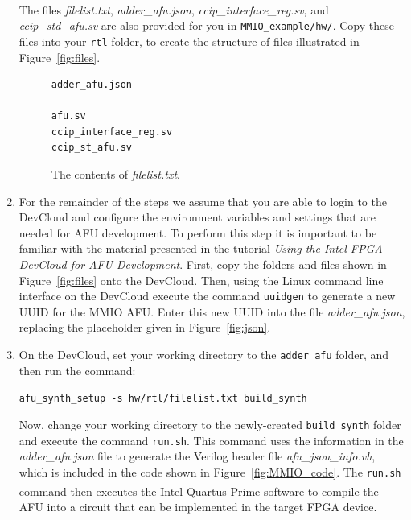 \documentclass[11pt, twoside, pdftex]{article}
\begin{document}
\begin{enumerate}
~\\
\noindent
The files {\it filelist.txt}, {\it adder\_afu.json}, {\it ccip\_interface\_reg.sv}, and 
{\it ccip\_std\_afu.sv} are also provided for you in \texttt{MMIO\_example/hw/}. Copy these files into your \texttt{rtl} folder, to
create the structure of files illustrated in Figure~\ref{fig:files}.

\lstset{language=C,numbers=none,escapechar=|}
\begin{figure}[h]
\begin{center}
\begin{minipage}[h]{4.5 cm}
\begin{lstlisting}[name=filelist]
adder_afu.json

afu.sv
ccip_interface_reg.sv
ccip_st_afu.sv
\end{lstlisting}
\end{minipage}
\caption{The contents of {\it filelist.txt}.}
\label{fig:filelist}
\end{center}
\end{figure}


\item
For the remainder of the steps we assume that you are able to login to the DevCloud
and configure the environment variables and settings that are needed for AFU development. 
To perform this step it is important to be familiar with the material presented in the
tutorial {\it Using the Intel FPGA DevCloud for AFU Development}. First, 
copy the folders and files shown in Figure~\ref{fig:files} onto the DevCloud.  Then, 
using the Linux command line interface on the DevCloud execute the command 
\texttt{uuidgen} to generate a new UUID for the MMIO AFU.
Enter this new UUID into the file {\it adder\_afu.json}, replacing the placeholder given in
Figure~\ref{fig:json}.

\item
On the DevCloud, set your working directory to the \texttt{adder\_afu} folder, and then 
run the command: 

\noindent
\begin{center}
\texttt{afu\_synth\_setup -s hw/rtl/filelist.txt build\_synth}
\end{center}

Now, change your working directory to the newly-created \texttt{build\_synth} folder and 
execute the command \texttt{run.sh}. This command uses the information in 
the {\it adder\_afu.json} file to generate the Verilog header file {\it afu\_json\_info.vh}, 
which is included in the code shown in Figure~\ref{fig:MMIO_code}. 
The \texttt{run.sh} command then executes the Intel 
Quartus\textsuperscript{\textregistered} Prime software to compile the AFU into a circuit
that can be implemented in the target FPGA device.


\end{enumerate}
\end{document}
